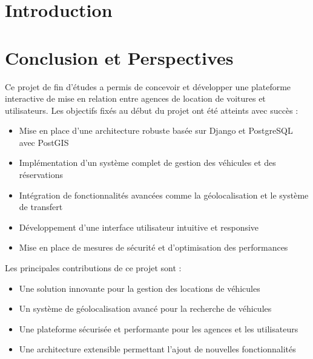 \documentclass[a4paper, oneside, 12pt, final]{extreport}
\begin{document}
\tableofcontents

\listoffigures
\listoftables
\listofalgorithms
{}
\cleardoublepage

\newpage
{}
\chapter*{Introduction}
\label{chap:general_introduction}




\label{chap:1}


\label{chap:2}

\label{chap:3}

\label{chap:4}

\label{chap:5}


\chapter*{Conclusion et Perspectives}
\label{chap:conclusion}
%

Ce projet de fin d'études a permis de concevoir et développer une plateforme interactive de mise en relation entre agences de location de voitures et utilisateurs. Les objectifs fixés au début du projet ont été atteints avec succès :

\begin{itemize}
    \item Mise en place d'une architecture robuste basée sur Django et PostgreSQL avec PostGIS
    \item Implémentation d'un système complet de gestion des véhicules et des réservations
    \item Intégration de fonctionnalités avancées comme la géolocalisation et le système de transfert
    \item Développement d'une interface utilisateur intuitive et responsive
    \item Mise en place de mesures de sécurité et d'optimisation des performances
\end{itemize}

Les principales contributions de ce projet sont :
\begin{itemize}
    \item Une solution innovante pour la gestion des locations de véhicules
    \item Un système de géolocalisation avancé pour la recherche de véhicules
    \item Une plateforme sécurisée et performante pour les agences et les utilisateurs
    \item Une architecture extensible permettant l'ajout de nouvelles fonctionnalités
\end{itemize}
\end{document}

